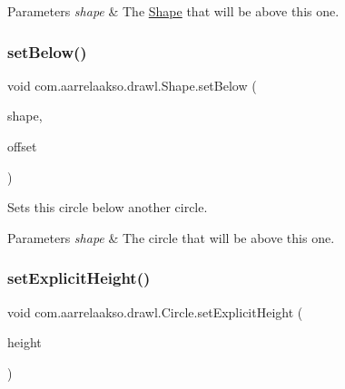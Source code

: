 \begin{DoxyParams}{Parameters}
{\em shape} & The \hyperlink{classcom_1_1aarrelaakso_1_1drawl_1_1_shape}{Shape} that will be above this one. \\
\hline
\end{DoxyParams}
\mbox{\label{classcom_1_1aarrelaakso_1_1drawl_1_1_shape_a9e6a74a094d67337b42a626d8aa167a8}} 
\subsubsection{\texorpdfstring{set\+Below()}{setBelow()}\hspace{0.1cm}{\footnotesize\ttfamily [2/2]}}
{\footnotesize\ttfamily void com.\+aarrelaakso.\+drawl.\+Shape.\+set\+Below (\begin{DoxyParamCaption}\item[{@Not\+Null \hyperlink{classcom_1_1aarrelaakso_1_1drawl_1_1_shape}{Shape}}]{shape,  }\item[{@Not\+Null \hyperlink{classcom_1_1aarrelaakso_1_1drawl_1_1_measure}{Measure}}]{offset }\end{DoxyParamCaption})\hspace{0.3cm}{\ttfamily [inherited]}}



Sets this circle below another circle. 


\begin{DoxyParams}{Parameters}
{\em shape} & The circle that will be above this one. \\
\hline
\end{DoxyParams}
\mbox{\label{classcom_1_1aarrelaakso_1_1drawl_1_1_circle_ab9d522fa3ba3c5ba770486a89d321159}} 
\subsubsection{\texorpdfstring{set\+Explicit\+Height()}{setExplicitHeight()}}
{\footnotesize\ttfamily void com.\+aarrelaakso.\+drawl.\+Circle.\+set\+Explicit\+Height (\begin{DoxyParamCaption}\item[{@Nullable \hyperlink{classcom_1_1aarrelaakso_1_1drawl_1_1_drawl_number}{Drawl\+Number}}]{height }\end{DoxyParamCaption})\hspace{0.3cm}{\ttfamily [protected]}}



